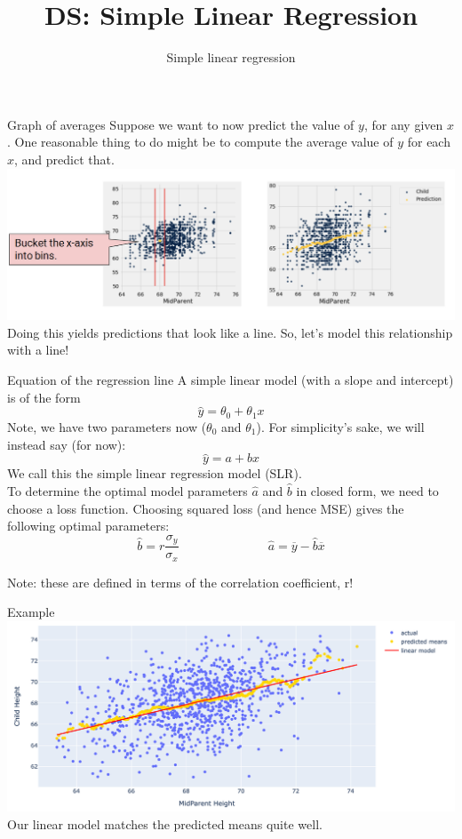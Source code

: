 \documentclass[aspectratio=169]{../latex_main/tntbeamer}  %
\title[Regression]{DS: Simple Linear Regression}
\subtitle{Simple linear regression}
\begin{document}
	
	\maketitle
	\begin{frame}{Graph of averages}
	    Suppose we want to now predict the value of $y$, for any given $x$. One reasonable thing to do might be to compute the average value of $y$ for each $x$, and predict that.\\
	    \includegraphics[scale=.45]{Bild3}\\
	    Doing this yields predictions that look like a line. So, let’s model this relationship with a line!

	\end{frame}
	
	
	\begin{frame}{Equation of the regression line}
	    A simple linear model (with a slope and intercept) is of the form
	    \begin{equation*}
	        \hat{y} = \theta_0 + \theta_1x
	    \end{equation*}
        Note, we have two parameters now ($\theta_0$ and $\theta_1$). For simplicity’s sake, we will instead say (for now):
        \begin{equation*}
	        \hat{y} = a + bx
	    \end{equation*}
        We call this the \alert{simple linear regression model (SLR)}.\\
        To determine the \alert{optimal model} parameters $\hat{a}$  and  $\hat{b}$ in closed form, we need to choose a loss function. Choosing squared loss (and hence MSE) gives the following optimal parameters:  
        \begin{equation*}
            \hat{b} = r\frac{\sigma_y}{\sigma_x}  \hspace{3cm}
            \hat{a} = \overline{y} -\hat{b}\overline{x}
        \end{equation*}

        Note: these are defined in terms of the correlation coefficient, r!

	\end{frame}
	
	
	\begin{frame}{Example}
	    \includegraphics[scale=.4]{Bild4}\\
	    Our linear model matches the predicted means quite well.
	\end{frame}
\end{document}
